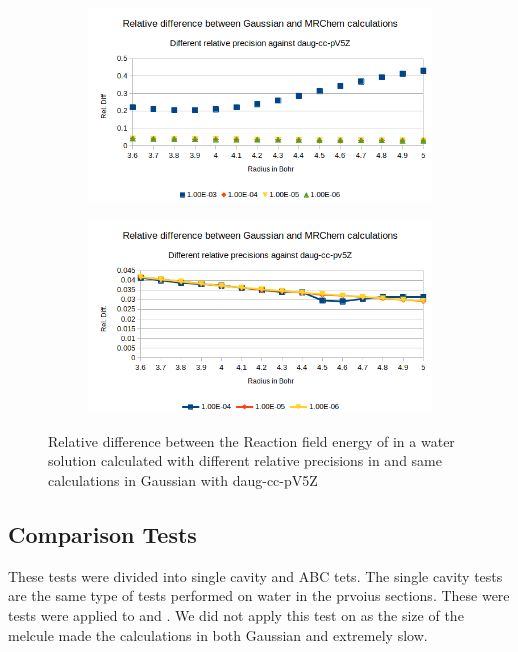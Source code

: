 \documentclass[../master_thesis.tex]{subfiles}
\begin{document}
\begin{figure}[h!]
  \centering
  \begin{subfigure}[b]{0.75\linewidth}
    \includegraphics[width=\linewidth]{img/lipprecallreldiff.png}
  \end{subfigure}
  \begin{subfigure}[b]{0.75\linewidth}
    \includegraphics[width=\linewidth]{img/lipprecallreldiffexcl.png}
  \end{subfigure}
  \caption{Relative difference between the Reaction field energy of  in a water solution calculated with different relative precisions in \mrchem  and same calculations in Gaussian with daug-cc-pV5Z}
  \label{fig:lipprecreldef}
\end{figure}

\subsection{Comparison Tests}

These tests were divided into single cavity and \ac{ABC} tets. The single cavity
tests are the same type of tests performed on water in the prvoius sections. These
were tests were applied to   and . We did not apply this test
on  as the size of the melcule made the calculations in both Gaussian
and \mrchem extremely slow.
\end{document}
